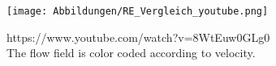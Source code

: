 \documentclass[11pt]{scrartcl}
\begin{document}

\begin{figure}[H]
\centering
\texttt{[image: Abbildungen/RE\_Vergleich\_youtube.png]}
\caption{https://www.youtube.com/watch?v=8WtEuw0GLg0 \\ The flow field is color coded according to velocity.}
\end{figure}

\newpage
{}


\end{document}
